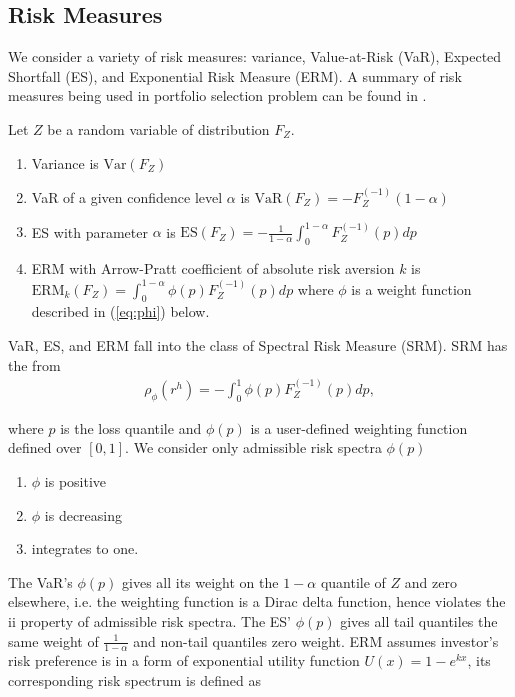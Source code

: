 \subsection{Risk Measures}\label{subsec:spectral-risk-measures}
We consider a variety of risk measures: variance, Value-at-Risk (VaR), Expected Shortfall (ES), and Exponential Risk Measure (ERM).
A summary of risk measures being used in portfolio selection problem can be found in \citet{hardle2008applied}.\medskip
\medskip


Let $Z$ be a random variable of distribution $F_Z$.
\begin{enumerate}
	\item Variance is $\text{Var}(F_Z)$
	\item VaR of a given confidence level $\alpha$ is $\text{VaR}(F_Z) = -F_{Z}^{(-1)}(1-\alpha)$
	\item ES with parameter $\alpha$ is $\text{ES}(F_Z) = -\frac{1}{1-\alpha}\int_0^{1-\alpha}F_Z^{(-1)}(p)dp$
	\item ERM with Arrow-Pratt coefficient of absolute risk aversion $k$ is $\text{ERM}_k(F_Z) = \int_0^{1-\alpha}\phi(p) F_Z^{(-1)}(p)dp$ where $\phi$ is a weight function described in (\ref{eq:phi}) below.
	\end{enumerate}\medskip

VaR, ES, and ERM fall into the class of Spectral Risk Measure (SRM).
SRM has the from \citep{Acerbi2002}%
\begin{align}
	\rho_\phi(r^h) = - \int_0^1 \phi(p) F_{Z}^{(-1)}(p)d p,
	\end{align}

where $p$ is the loss quantile and $\phi(p)$ is a user-defined weighting function defined over $[0,1]$. \medskip
We consider only admissible risk spectra $\phi(p)$ %
\begin{enumerate}[label=\roman*]
	\item $\phi$ is positive
	\item $\phi$ is decreasing
	\item integrates to one.
	\end{enumerate}\medskip

The VaR's $\phi(p)$ gives all its weight on the $1-\alpha$ quantile of $Z$ and zero elsewhere,
i.e. the weighting function is a Dirac delta function, hence violates the ii property of admissible risk spectra.
The ES' $\phi(p)$ gives all tail quantiles the same weight of $\frac{1}{1-\alpha}$ and non-tail quantiles zero weight.
ERM assumes investor's risk preference is in a form of exponential utility function $U(x)=1-e^{kx}$,
its corresponding risk spectrum is defined as


